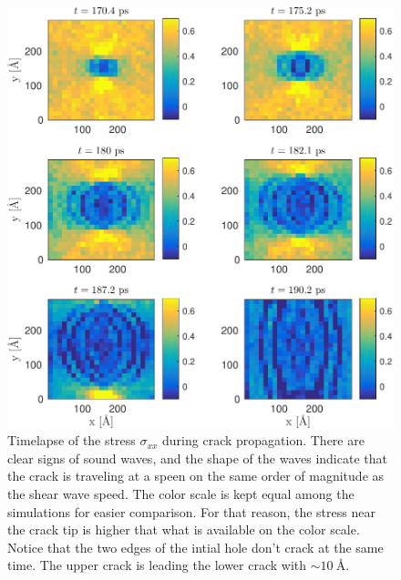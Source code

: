 \begin{figure}
\includegraphics[width=\textwidth]{../figures/thesis/stressfield_timelapse.pdf}
\caption{Timelapse of the stress $\sigma_{xx}$ during crack propagation. There are clear signs of sound waves, and the shape of the waves indicate that the crack is traveling at a speen on the same order of magnitude as the shear wave speed. The color scale is kept equal among the simulations for easier comparison. For that reason, the stress near the crack tip is higher that what is available on the color scale. Notice that the two edges of the intial hole don't crack at the same time. The upper crack is leading the lower crack 
with $\sim \SI{10}{\angstrom}$. }
\label{fig:stressfield_timelapse}
\end{figure}

